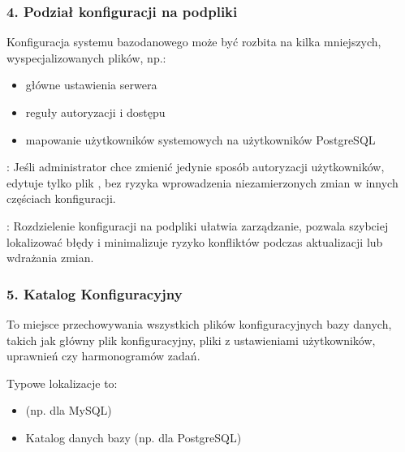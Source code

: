 \documentclass[letterpaper,10pt,polish]{sphinxmanual}
\begin{document}
\subsubsection{4. Podział konfiguracji na podpliki}
\label{\detokenize{rozdzial2/Konfiguracja_baz_danych/Konfiguracja_baz_danych:podzial-konfiguracji-na-podpliki}}
\sphinxAtStartPar
Konfiguracja systemu bazodanowego może być rozbita na kilka mniejszych, wyspecjalizowanych plików, np.:
\begin{itemize}
\item {} 
\sphinxAtStartPar
{} \textendash{} główne ustawienia serwera

\item {} 
\sphinxAtStartPar
{} \textendash{} reguły autoryzacji i dostępu

\item {} 
\sphinxAtStartPar
{} \textendash{} mapowanie użytkowników systemowych na użytkowników PostgreSQL

\end{itemize}

\sphinxAtStartPar
{}: Jeśli administrator chce zmienić jedynie sposób autoryzacji użytkowników, edytuje tylko plik , bez ryzyka wprowadzenia niezamierzonych zmian w innych częściach konfiguracji.

\sphinxAtStartPar
{}: Rozdzielenie konfiguracji na podpliki ułatwia zarządzanie, pozwala szybciej lokalizować błędy i minimalizuje ryzyko konfliktów podczas aktualizacji lub wdrażania zmian.


\subsubsection{5. Katalog Konfiguracyjny}
\label{\detokenize{rozdzial2/Konfiguracja_baz_danych/Konfiguracja_baz_danych:katalog-konfiguracyjny}}
\sphinxAtStartPar
To miejsce przechowywania wszystkich plików konfiguracyjnych bazy danych, takich jak główny plik konfiguracyjny, pliki z ustawieniami użytkowników, uprawnień czy harmonogramów zadań.

\sphinxAtStartPar
Typowe lokalizacje to:
\begin{itemize}
\item {} 
\sphinxAtStartPar
{} (np.  dla MySQL)

\item {} 
\sphinxAtStartPar
Katalog danych bazy (np.  dla PostgreSQL)

\end{itemize}
\end{document}

